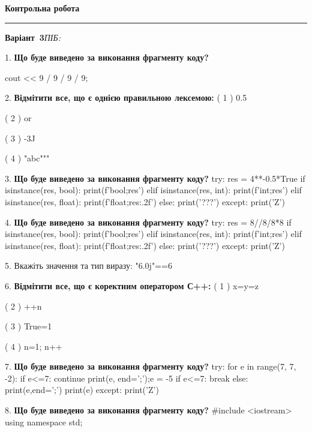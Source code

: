 \documentclass[11pt]{article}
\begin{document}
\newpage

\newpage

{\centering\Large\bfseries Контрольна робота\par}
\medskip
\noindent\rule{\linewidth}{0.5pt}
\smallskip
\noindent\textbf{Варіант \No\,3}\hfill \textit{ПІБ:}\,\underline{\hspace{60mm}}
\vspace{4mm}

1. \textbf{Що буде виведено за виконання фрагменту коду?}

cout << 9 / 9 / 9 / 9;
\par\vspace{5mm}
2. %
\textbf{Відмітити все, що є однією правильною лексемою:}
( 1 ) 0.5

( 2 ) or

( 3 ) -3J

( 4 ) "abc"""
\par\vspace{5mm}
3. \textbf{Що буде виведено за виконання фрагменту коду?}
try:
    res = 4**-0.5*True
    if isinstance(res, bool):
        print(f'bool;{res}')
    elif isinstance(res, int):
        print(f'int;{res}')
    elif isinstance(res, float):
        print(f'float;{res:.2f}')
    else:
        print('???')
except:
    print('Z')
\par\vspace{5mm}
4. \textbf{Що буде виведено за виконання фрагменту коду?}
try:
    res = 8//8/8*8
    if isinstance(res, bool):
        print(f'bool;{res}')
    elif isinstance(res, int):
        print(f'int;{res}')
    elif isinstance(res, float):
        print(f'float;{res:.2f}')
    else:
        print('???')
except:
    print('Z')
\par\vspace{5mm}
5. 
Вкажіть значення та тип виразу:
"6.0j"==6
\par\vspace{5mm}
6. %
\textbf{Відмітити все, що є коректним оператором С++:}
( 1 ) x=y=z

( 2 ) ++n

( 3 ) True=1

( 4 ) n=1; n++
\par\vspace{5mm}
7. \textbf{Що буде виведено за виконання фрагменту коду?}
try:
    for e in range(7, 7, -2):
        if e<=7:
            continue
        print(e, end=';');e = -5
        if e<=7:
            break
    else:
        print(e,end=';')
    print(e)
except:
    print('Z')
\par\vspace{5mm}
8. \textbf{Що буде виведено за виконання фрагменту коду?}
#include <iostream>
using namespace std;
\end{document}
